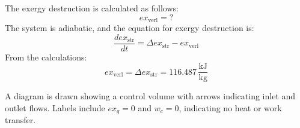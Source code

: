The exergy destruction is calculated as follows:  
\[
ex_{\text{verl}} = ?
\]  
The system is adiabatic, and the equation for exergy destruction is:  
\[
\frac{d ex_{\text{str}}}{dt} = \Delta ex_{\text{str}} - ex_{\text{verl}}
\]  
From the calculations:  
\[
ex_{\text{verl}} = \Delta ex_{\text{str}} = 116.487 \, \frac{\text{kJ}}{\text{kg}}
\]  

A diagram is drawn showing a control volume with arrows indicating inlet and outlet flows. Labels include \( ex_q = 0 \) and \( w_c = 0 \), indicating no heat or work transfer.